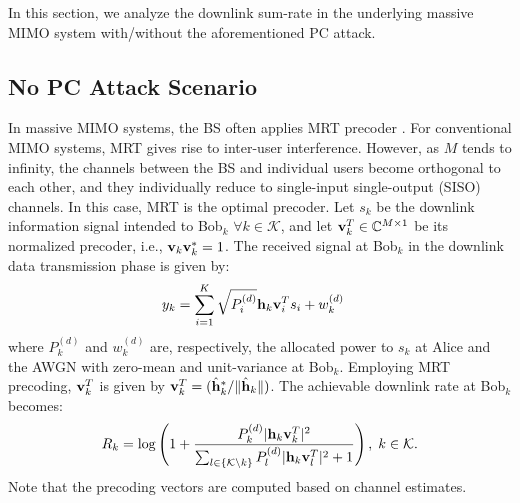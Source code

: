 \documentclass[draftclsnofoot, 12pt, onecolumn, journal]{IEEEtran}
\newcommand{\hv}{{\bf h}}
\newcommand{\vv}{{\bf v}}
\begin{document}
In this section, we analyze the downlink sum-rate in the underlying massive MIMO system with/without the aforementioned PC attack. 

\subsection{No PC Attack Scenario}

In massive MIMO systems, the BS often applies MRT precoder \cite{Bj2016, Larsson2014, Lu2014, fernandes2013inter}.
For conventional MIMO systems, MRT gives rise to inter-user interference.
However, as $M$ tends to infinity, the channels between the BS and individual users become orthogonal to each other, and they individually reduce to single-input single-output (SISO) channels.
In this case, MRT is the optimal precoder.
Let $s_k$ be the downlink information signal intended to Bob$_k$ $\forall k \in \mathcal{K}$, and let $\vv_k^T \in \mathbb{C}^{M \times 1}$ be its normalized precoder, i.e., $\vv_k \vv_k^* = 1$.
The received signal at Bob$_k$ in the downlink data transmission phase is given by:
%
\begin{align}
y_k &= \sum_{i = 1}^K \sqrt{P_i^{(d)}} \hv_k \vv_i^T s_i + w_k^{(d)} 
\label{eq:rec_sig_bobk}
\end{align}
%
where $P_k^{(d)}$ and $w_k^{(d)}$ are, respectively, the allocated power to $s_k$ at Alice and the AWGN with zero-mean and unit-variance at Bob$_k$.
Employing MRT precoding, $\vv_k^T$ is given by $\vv_k^T = (\hat{\hv}_k^* / \Vert \hat{\hv}_k \Vert ) $.
The achievable downlink rate at Bob$_k$ becomes:
%
\begin{align}
\label{eq:original_rates}
R_k = \log \left( 1 + \frac{ P_k^{(d)} \vert  \hv_k \vv_k^T \vert^2}{ \sum_{l \in \{ \mathcal{K} \setminus k \} }P_l^{(d)} \vert  \hv_k \vv_l^T \vert^2 + 1} \right), \; k \in \mathcal{K}.
\end{align}
%
Note that the precoding vectors are computed based on channel estimates.
\end{document}
